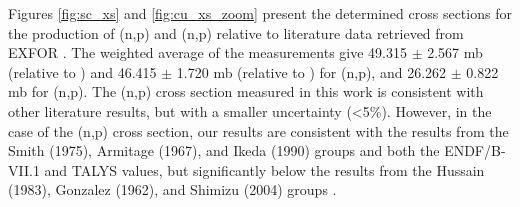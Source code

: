 \documentclass[5p]{elsarticle}
\newcommand{\comment}[1]{\todo[color=blue!20!white,inline]{ASV: #1}}
\begin{document}
Figures \ref{fig:sc_xs} and \ref{fig:cu_xs_zoom} present the determined cross sections for the production of  (n,p) and (n,p)  relative to literature data retrieved from EXFOR \cite{Otuka2014272,PhysRev.114.565,doi:10.1143/JPSJ.17.1215,paulsen1967cross,doi:10.1139/p72-336,Smith1975,King1979,Hussain1983,Ikeda1991,Shimizu2004543,PhysRev.126.271,Armitage1967,Ikeda1990,Senga2000,Shimizu2004975}.
The weighted average of the measurements give   49.315 $\pm$ 2.567 mb (relative to ) and 46.415 $\pm$ 1.720 mb (relative to )   for (n,p),   and 26.262 $\pm$  0.822 mb for  (n,p).
The (n,p) cross section measured in this work is consistent with  other literature results, but with a smaller uncertainty (\textless 5\%).
However, in the case of the (n,p) cross section, our results are consistent with the results from the Smith (1975), Armitage (1967), and Ikeda (1990) groups \cite{Smith1975,Armitage1967,Ikeda1990} and both the ENDF/B-VII.1 \cite{Chadwick2011} and TALYS \cite{Koning2012}  values, but significantly below the results from the Hussain (1983), Gonzalez (1962), and Shimizu (2004) groups \cite{Hussain1983,PhysRev.126.271,Shimizu2004975}.
 





\end{document}
